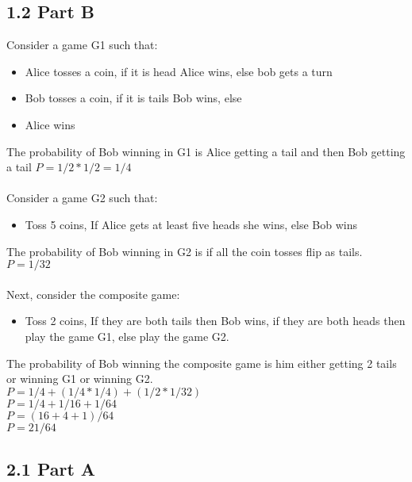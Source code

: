 \documentclass[12pt]{article}
\begin{document}
\subsection*{1.2 Part B} 

\vspace{10pt}

Consider a game G1 such that: 
\begin{itemize}
\item Alice tosses a coin, if it is head Alice wins, else bob gets a turn 
\item Bob tosses a coin, if it is tails Bob wins, else
\item Alice wins
\end{itemize} 
The probability of Bob winning in G1 is Alice getting a tail and then Bob getting a tail \(P=1/2*1/2=1/4\)
\\ \\
Consider a game G2 such that:
\begin{itemize}
    \item Toss 5 coins, If Alice gets at least five heads she wins, else Bob wins
\end{itemize}
The probability of Bob winning in G2 is if all the coin tosses flip as tails. \(P=1/32\)
\\ \\
Next, consider the composite game:
\begin{itemize}
    \item Toss 2 coins, If they are both tails then Bob wins, if they are both heads then play the game G1, else play the game G2.  
\end{itemize}
The probability of Bob winning the composite game is him either getting 2 tails or winning G1 or winning G2. \\
\(P=1/4+(1/4*1/4)+(1/2*1/32)\) \\
\(P=1/4+1/16+1/64\) \\
\(P=(16+4+1)/64\) \\
\(P=21/64\)


\subsection*{2.1 Part A} 

\vspace{10pt}
\end{document}

